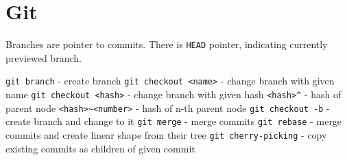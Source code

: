\section{Git}


Branches are pointer to commits. There is \verb|HEAD| pointer, indicating currently previewed branch.

 \verb|git branch| - create branch
 \verb|git checkout <name>| - change branch with given name
 \verb|git checkout <hash>| - change branch with given hash
 \verb|<hash>^| - hash of parent node
 \verb|<hash>~<number>| - hash of n-th parent node
 \verb|git checkout -b| - create branch and change to it
 \verb|git merge| - merge commits
 \verb|git rebase| - merge commits and create linear shape from their tree
 \verb|git cherry-picking| - copy existing commits as children of given commit
